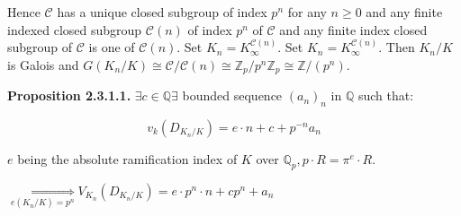 \documentclass{article}
\theoremstyle{definition}
\numberwithin{theorem}{subsection}
\begin{document}
    Hence \(\mathscr{C}\) has a unique closed subgroup of index \(p^n\) for any \(n \geq 0\) and any finite indexed closed subgroup \(\mathscr{C}(n)\) of index \(p^n\) of \(\mathscr{C}\) and any finite index closed subgroup of \(\mathscr{C}\) is one of \(\mathscr{C}(n)\). Set \(K_n = K_\infty^{\mathscr{C}(n)}\). Set \(K_n = K_\infty ^{\mathscr{C} (n)}\). Then \(K_n / K\) is Galois and \(G(K_n / K) \cong \mathscr{C} / \mathscr{C}(n) \cong \mathbb{Z}_p / p^n \mathbb{Z}_p \cong \mathbb{Z} / (p^n)\).

    \textbf{Proposition 2.3.1.1.} \(\exists c\in \mathbb{Q} \exists\) bounded sequence \((a_n)_n\) in \(\mathbb{Q}\) such that:

    \[
        v_k(D_{K_n / K}) = e \cdot n + c + p^{-n} a_n
    \]

    \(e\) being the absolute ramification index of \(K\) over \(\mathbb{Q}_p, p \cdot R= \pi^e \cdot R\). 

    \(\underset{e(K_n / K) = p^n}{\iff} V_{K_n}(D_{K_n / K}) = e \cdot p^n \cdot n + c p^n + a_n\) 
\end{document}
